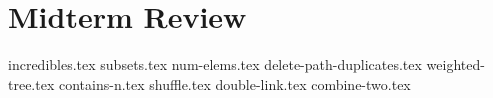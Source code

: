 \documentclass{exam}
\begin{document}
\section{Midterm Review}
\begin{questions}
    {incredibles.tex}
    {subsets.tex}
    \newpage
    {num-elems.tex}
    \newpage
    {delete-path-duplicates.tex}
    {weighted-tree.tex}
    {contains-n.tex}
    {shuffle.tex}
    {double-link.tex}
    {combine-two.tex}
\end{questions}
\end{document}
